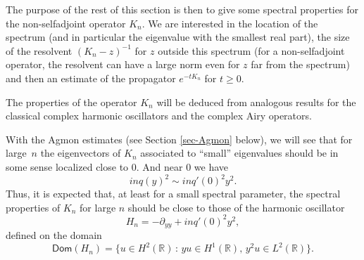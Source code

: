 \documentclass[11pt]{article}
\numberwithin{equation}{section}
\theoremstyle{plain}
\theoremstyle{definition}
\newcommand{\set}[1]{\{ #1\}}
\newcommand{\inv}{^{-1}}
\newcommand{\1}{\mathds 1}
\newcommand{\st}{\,:\,}
\newcommand{\Dom}{\mathsf{Dom}}
\newcommand{\R}{\mathbb{R}}
\begin{document}
The purpose of the rest of this section is then to give some spectral properties for the non-selfadjoint operator $K_n$. We are interested in the location of the spectrum (and in particular the eigenvalue with the smallest real part), the size of the resolvent $(K_n-z)\inv$ for $z$ outside this spectrum (for a non-selfadjoint operator, the resolvent can have a large norm even for $z$ far from the spectrum) and then an estimate of the propagator $e^{-t K_n}$ for $t \geq 0$.

The properties of the operator $K_n$ will be deduced from analogous results for the classical complex harmonic oscillators and the complex Airy operators.

With the Agmon estimates (see Section \ref{sec-Agmon} below), we will see that for large~$n$ the eigenvectors of $K_n$ associated to ``small'' eigenvalues should be in some sense localized close to 0. And near 0 we have
\[
in q(y)^2 \sim i n q'(0)^2 y^2.
\]
Thus, it is expected that, at least for a small spectral parameter, the spectral properties of $K_n$ for large $n$ should be close to those of the harmonic oscillator
\begin{equation} \label{def-Hn}
H_n = -\partial_{yy} + i n q'(0)^2 y^2,
\end{equation}
defined on the domain
\[
\Dom(H_n) = \set{ u \in H^2(\R) \st yu \in H^1(\R),\, y^2 u \in L^2(\R)}.
\]
\end{document}
